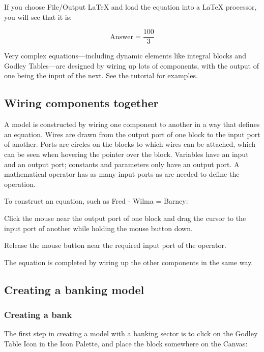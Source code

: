 If you choose File/Output LaTeX and load the equation into a LaTeX processor, you will see that it is:

\begin{displaymath}
\mathrm{Answer}=\frac{100}{3}
\end{displaymath}

Very complex equations---including dynamic elements like integral
blocks and Godley Tables---are designed by wiring up lots of
components, with the output of one being the input of the next. See
the tutorial for examples.

\subsection{Wiring components together}

A model is constructed by wiring one component to another in a way
that defines an equation. Wires are drawn from the output port of one
block to the input port of another. Ports are circles on the blocks to
which wires can be attached, which can be seen when hovering the
pointer over the block. Variables have an input and an output
port; constants and parameters only have an output port. A
mathematical operator has as many input ports as are needed to define
the operation.


To construct an equation, such as Fred - Wilma = Barney:

Click the mouse near the output port of one block and drag the
cursor to the input port of another while holding the mouse button
down. 


Release the mouse button near the required input port of the operator.



The equation is completed by wiring up the other components in the same way.



\subsection{Creating a banking model}
\label{creatingBankingModel}

\subsubsection{Creating a bank}

The first step in creating a model with a banking sector is to click on the Godley Table Icon in the Icon Palette, and place the block somewhere on the Canvas:

